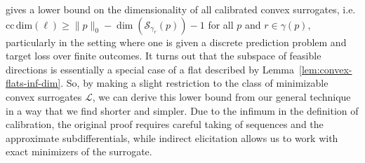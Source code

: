 \documentclass[anon,12pt]{colt2021} %
\newcommand{\Comments}{1}
\newcommand{\mynote}[2]{\ifnum\Comments=1\textcolor{#1}{#2}\fi}
\newcommand{\jessie}[1]{\mynote{purple}{[JF: #1]}}
\newcommand{\reals}{\mathbb{R}}
\newcommand{\ccdim}{\mathrm{cc\,dim}}
\newcommand{\rank}{\mathrm{rank}}
\newcommand{\zeros}[1]{\mathrm{ker}_\P\,#1}
\newcommand{\codim}{\mathrm{codim}}
\newcommand{\Pcodim}{\mathcal{P}\!\text{-}\mathrm{codim}}
\newcommand{\E}{\mathbb{E}}
\renewcommand{\L}{\mathcal{L}}
\newcommand{\R}{\mathcal{R}}
\renewcommand{\P}{\mathcal{P}}
\newcommand{\Sc}{\mathcal{S}}  %
\newcommand{\Y}{\mathcal{Y}}
\newcommand{\toto}{\rightrightarrows}
\begin{document}
\citet{ramaswamy2016convex} gives a lower bound on the dimensionality of all calibrated convex surrogates, i.e. $\ccdim(\ell) \geq \|p\|_0 - \dim(\Sc_{\gamma_r}(p)) - 1$ for all $p$ and $r \in \gamma(p)$, particularly in the setting where one is given a discrete prediction problem and target loss over finite outcomes.
It turns out that the subspace of feasible directions is essentially a special case of a flat described by Lemma~\ref{lem:convex-flats-inf-dim}.
So, by making a slight restriction to the class of minimizable convex surrogates $\L$, we can derive this lower bound from our general technique in a way that we find shorter and simpler.
Due to the infimum in the definition of calibration, the original proof requires careful taking of sequences and the approximate subdifferentials, while indirect elicitation allows us to work with exact minimizers of the surrogate.

%	
\end{document}
